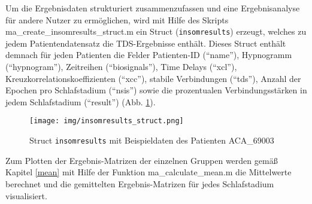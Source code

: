 Um die Ergebnisdaten strukturiert zusammenzufassen und eine Ergebnisanalyse für andere Nutzer zu ermöglichen, wird mit Hilfe des Skripts ma\_create\_insomresults\_struct.m ein Struct (\texttt{insomresults}) erzeugt, welches zu jedem Patientendatensatz die \acs{TDS}-Ergebnisse enthält. Dieses Struct enthält demnach für jeden Patienten die Felder Patienten-ID ("`name"'), Hypnogramm ("`hypnogram"'), Zeitreihen ("`biosignals"'), Time Delays ("`xcl"'), Kreuzkorrelationskoeffizienten ("`xcc"'), stabile Verbindungen ("`tds"'), Anzahl der Epochen pro Schlafstadium ("`nsis"') sowie die prozentualen Verbindungsstärken in jedem Schlafstadium ("`result"') (Abb. \ref{fig:resultstruct}).

\begin{figure}[H]
	\centering
	\texttt{[image: img/insomresults\_struct.png]}
	\caption[Struct \texttt{insomresults} mit Beispieldaten]{Struct \texttt{insomresults} mit Beispieldaten des Patienten ACA\_69003}
	\label{fig:resultstruct}
\end{figure}

Zum Plotten der Ergebnis-Matrizen der einzelnen Gruppen werden gemäß Kapitel \ref{mean} mit Hilfe der Funktion ma\_calculate\_mean.m die Mittelwerte berechnet und die gemittelten Ergebnis-Matrizen für jedes Schlafstadium visualisiert.

